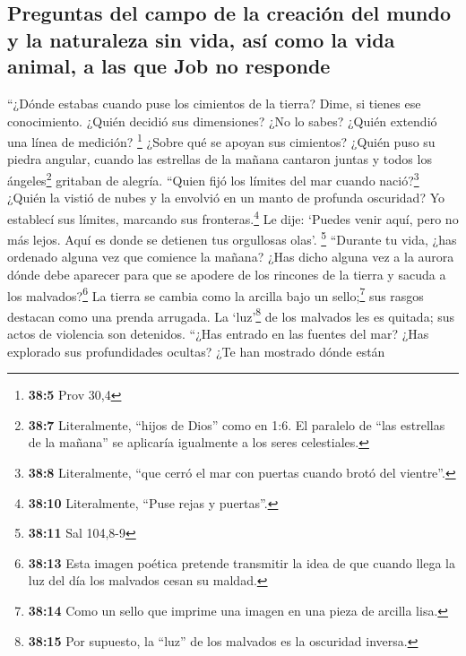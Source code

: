 \hypertarget{preguntas-del-campo-de-la-creaciuxf3n-del-mundo-y-la-naturaleza-sin-vida-asuxed-como-la-vida-animal-a-las-que-job-no-responde}{%
\subsection{Preguntas del campo de la creación del mundo y la naturaleza
sin vida, así como la vida animal, a las que Job no
responde}\label{preguntas-del-campo-de-la-creaciuxf3n-del-mundo-y-la-naturaleza-sin-vida-asuxed-como-la-vida-animal-a-las-que-job-no-responde}}

 ``¿Dónde estabas cuando puse los cimientos de la tierra?
Dime, si tienes ese conocimiento.  ¿Quién decidió sus
dimensiones? ¿No lo sabes? ¿Quién extendió una línea de medición?
\footnote{\textbf{38:5} Prov 30,4}  ¿Sobre qué se apoyan
sus cimientos? ¿Quién puso su piedra angular,  cuando las
estrellas de la mañana cantaron juntas y todos los ángeles\footnote{\textbf{38:7}
  Literalmente, ``hijos de Dios'' como en 1:6. El paralelo de ``las
  estrellas de la mañana'' se aplicaría igualmente a los seres
  celestiales.} gritaban de alegría.  ``Quien fijó los
límites del mar cuando nació?\footnote{\textbf{38:8} Literalmente, ``que
  cerró el mar con puertas cuando brotó del vientre''.} 
¿Quién la vistió de nubes y la envolvió en un manto de profunda
oscuridad?  Yo establecí sus límites, marcando sus
fronteras.\footnote{\textbf{38:10} Literalmente, ``Puse rejas y
  puertas''.}  Le dije: `Puedes venir aquí, pero no más
lejos. Aquí es donde se detienen tus orgullosas olas'. \footnote{\textbf{38:11}
  Sal 104,8-9}  ``Durante tu vida, ¿has ordenado alguna
vez que comience la mañana?  ¿Has dicho alguna vez a la
aurora dónde debe aparecer para que se apodere de los rincones de la
tierra y sacuda a los malvados?\footnote{\textbf{38:13} Esta imagen
  poética pretende transmitir la idea de que cuando llega la luz del día
  los malvados cesan su maldad.}  La tierra se cambia
como la arcilla bajo un sello;\footnote{\textbf{38:14} Como un sello que
  imprime una imagen en una pieza de arcilla lisa.} sus rasgos destacan
como una prenda arrugada.  La `luz'\footnote{\textbf{38:15}
  Por supuesto, la ``luz'' de los malvados es la oscuridad inversa.} de
los malvados les es quitada; sus actos de violencia son detenidos.
 ``¿Has entrado en las fuentes del mar? ¿Has explorado
sus profundidades ocultas?  ¿Te han mostrado dónde están
